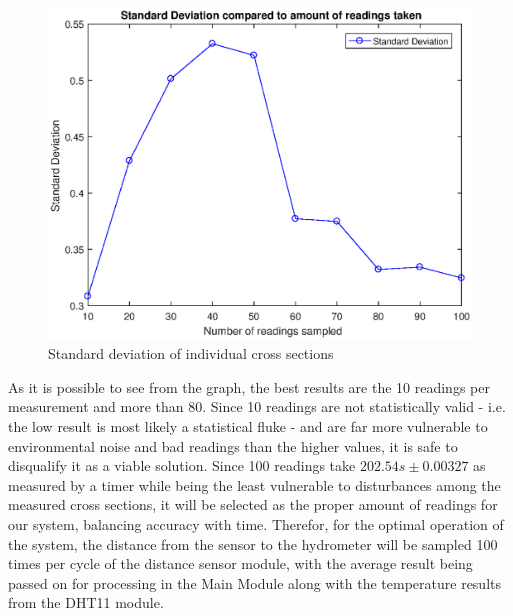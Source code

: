 \documentclass[twoside]{ctuthesis}
\theoremstyle{plain}
\theoremstyle{definition}
\theoremstyle{note}
\begin{document}
\begin{figure}[H]
	\centering
	\includegraphics[width = \textwidth]{CrossSectionReadingsStd}
	\caption{Standard deviation of individual cross sections}
\end{figure}


As it is possible to see from the graph, the best results are the 10 readings per measurement and more than 80. Since 10 readings are not statistically valid - i.e. the low result is most likely a statistical fluke - and are far more vulnerable to environmental noise and bad readings than the higher values, it is safe to disqualify it as a viable solution. Since 100 readings take $202.54 s\pm0.00327$ as measured by a timer while being the least vulnerable to disturbances among the measured cross sections, it will be selected as the proper amount of readings for our system, balancing accuracy with time.
Therefor, for the optimal operation of the system, the distance from the sensor to the hydrometer will be sampled 100 times per cycle of the distance sensor module, with the average result being passed on for processing in the Main Module along with the temperature results from the DHT11 module.
\end{document}
